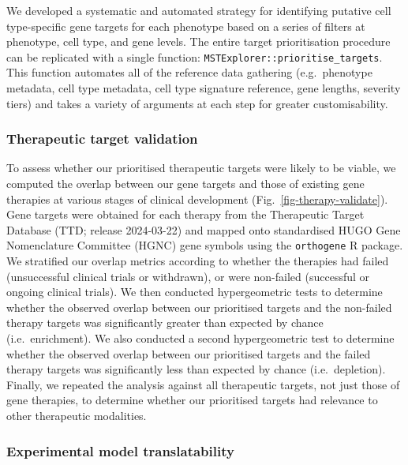\documentclass[
sn-nature
]{sn-jnl}
\begin{document}
We developed a systematic and automated strategy for identifying
putative cell type-specific gene targets for each phenotype based on a
series of filters at phenotype, cell type, and gene levels. The entire
target prioritisation procedure can be replicated with a single
function: \texttt{MSTExplorer::prioritise\_targets}. This function
automates all of the reference data gathering (e.g.~phenotype metadata,
cell type metadata, cell type signature reference, gene lengths,
severity tiers) and takes a variety of arguments at each step for
greater customisability.

\subsubsection{Therapeutic target
validation}\label{therapeutic-target-validation-1}

To assess whether our prioritised therapeutic targets were likely to be
viable, we computed the overlap between our gene targets and those of
existing gene therapies at various stages of clinical development
(Fig.~\ref{fig-therapy-validate}). Gene targets were obtained for each
therapy from the Therapeutic Target Database (TTD; release 2024-03-22)
and mapped onto standardised HUGO Gene Nomenclature Committee (HGNC)
gene symbols using the \texttt{orthogene} R package. We stratified our
overlap metrics according to whether the therapies had failed
(unsuccessful clinical trials or withdrawn), or were non-failed
(successful or ongoing clinical trials). We then conducted
hypergeometric tests to determine whether the observed overlap between
our prioritised targets and the non-failed therapy targets was
significantly greater than expected by chance (i.e.~enrichment). We also
conducted a second hypergeometric test to determine whether the observed
overlap between our prioritised targets and the failed therapy targets
was significantly less than expected by chance (i.e.~depletion).
Finally, we repeated the analysis against all therapeutic targets, not
just those of gene therapies, to determine whether our prioritised
targets had relevance to other therapeutic modalities.

\subsubsection{Experimental model
translatability}\label{experimental-model-translatability-1}
\end{document}
